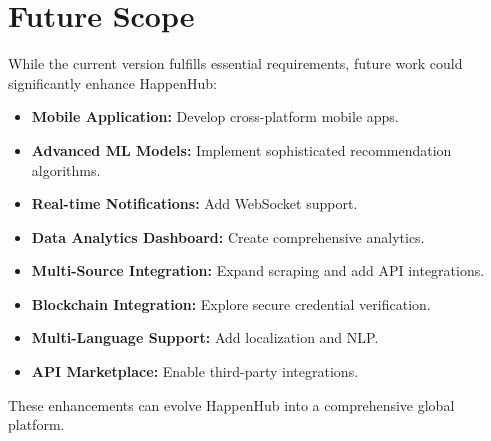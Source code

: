 \documentclass[12pt, a4paper]{report}
\begin{document}
\section{Future Scope} %
While the current version fulfills essential requirements, future work could significantly enhance HappenHub:
\begin{itemize}
    \item \textbf{Mobile Application:} Develop cross-platform mobile apps.
    \item \textbf{Advanced ML Models:} Implement sophisticated recommendation algorithms.
    \item \textbf{Real-time Notifications:} Add WebSocket support.
    \item \textbf{Data Analytics Dashboard:} Create comprehensive analytics.
    \item \textbf{Multi-Source Integration:} Expand scraping and add API integrations.
    \item \textbf{Blockchain Integration:} Explore secure credential verification.
    \item \textbf{Multi-Language Support:} Add localization and NLP.
    \item \textbf{API Marketplace:} Enable third-party integrations.
\end{itemize}
These enhancements can evolve HappenHub into a comprehensive global platform.
\end{document}
